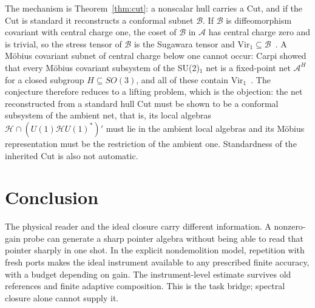 \documentclass[12pt]{article}
\theoremstyle{definition}
\theoremstyle{remark}
\newcommand{\Vir}{\mathrm{Vir}}
\begin{document}
The mechanism is Theorem~\ref{thm:cut}: a nonscalar hull carries a Cut, and if the Cut
is standard it reconstructs a conformal subnet \(\mathcal B\). If \(\mathcal B\) is
diffeomorphism covariant with central charge one, the coset of \(\mathcal B\) in
\(\mathcal A\) has central charge zero and is trivial, so the stress tensor of
\(\mathcal B\) is the Sugawara tensor and \(\Vir_1\subseteq\mathcal B\)~\cite{GKO1986}.
A M\"obius covariant subnet of central charge below one cannot occur: Carpi showed that every M\"obius covariant subsystem of the SU(2)\(_1\) net is a fixed-point net \(\mathcal A^H\) for a closed subgroup \(H\subseteq SO(3)\), and all of these contain \(\Vir_1\)~\cite{Carpi1999}. The conjecture therefore reduces to a lifting problem, which is the objection: the net reconstructed from a standard hull Cut must be shown to be a conformal subsystem of the ambient net, that is, its local algebras \(\mathcal H\cap(U(1)\mathcal HU(1)^*)'\) must lie in the ambient local algebras and its M\"obius representation must be the restriction of the ambient one. Standardness of the inherited Cut is also not automatic.

\section{Conclusion}\label{sec:conclusion}

The physical reader and the ideal closure carry different information.
A nonzero-gain probe can generate a sharp pointer algebra without being
able to read that pointer sharply in one shot. In the explicit
nondemolition model, repetition with fresh ports makes the ideal
instrument available to any prescribed finite accuracy, with a budget
depending on gain. The instrument-level estimate survives old
references and finite adaptive composition. This is the task bridge;
spectral closure alone cannot supply it.
\end{document}
